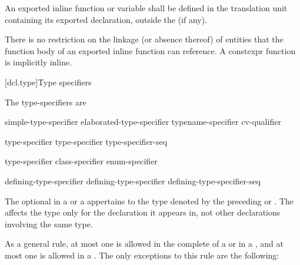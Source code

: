 \pnum
An exported inline function or variable
shall be defined in the translation unit
containing its exported declaration,
outside the  (if any).
\begin{note}
There is no restriction on the linkage (or absence thereof)
of entities that the function body of an exported inline function
can reference. A constexpr function is implicitly inline.
\end{note}

[dcl.type]{Type specifiers}%

\pnum
The type-specifiers are

%
%
%
\begin{bnf}
\br
  simple-type-specifier\br
  elaborated-type-specifier\br
  typename-specifier\br
  cv-qualifier
\end{bnf}

\begin{bnf}
\br
    type-specifier \br
    type-specifier type-specifier-seq
\end{bnf}

\begin{bnf}
\br
    type-specifier\br
    class-specifier\br
    enum-specifier
\end{bnf}

\begin{bnf}
\br
  defining-type-specifier \br
  defining-type-specifier defining-type-specifier-seq
\end{bnf}

The optional  in a 
or a 
appertains
to the type denoted by the preceding 
or . The
 affects the type only for the declaration it appears in,
not other declarations involving the same type.

\pnum
As a general rule, at most one
is allowed in the complete
 of a  or in a
,
and at most one
is allowed in a
.
The only exceptions to this rule are the following:

